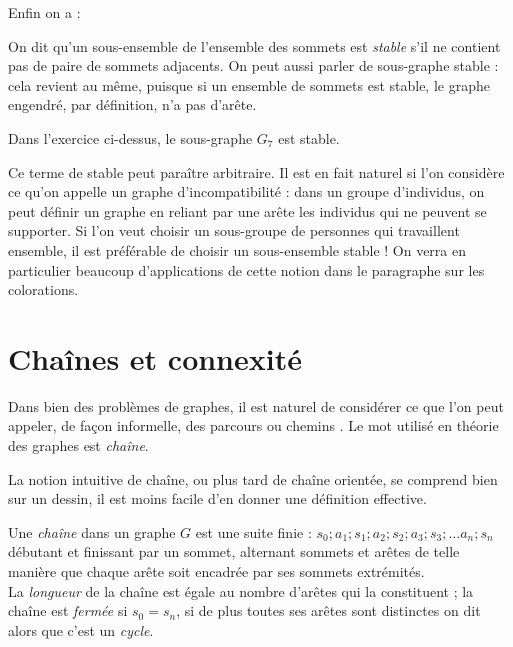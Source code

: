 \documentclass[french]{book}
\begin{document}
Enfin on a :

\begin{defn} On dit qu'un sous-ensemble de l'ensemble des sommets est \emph{stable} s'il ne contient pas de paire de sommets adjacents.
On peut aussi parler de sous-graphe stable : cela revient au même, puisque si un ensemble de
sommets est stable, le graphe engendré, par définition, n'a pas d'arête. \end{defn}

\begin{exemple} Dans l'exercice ci-dessus, le sous-graphe $G_7$ est stable. \end{exemple}

Ce terme de \og stable \fg{} peut paraître arbitraire. Il est en fait naturel si l'on considère ce qu'on appelle un \og graphe d'incompatibilité \fg{} : dans un groupe d'individus, on peut définir un graphe en reliant par une arête les individus qui ne peuvent se supporter. Si l'on veut choisir un sous-groupe de personnes qui travaillent ensemble, il est préférable de choisir un sous-ensemble stable ! On verra en particulier beaucoup d'applications de cette notion dans le paragraphe sur les colorations.

\section{Chaînes et connexité}

Dans bien des problèmes de graphes, il est naturel de considérer ce que l'on peut appeler, de façon informelle, des \og parcours \fg{} ou \og chemins \fg. Le mot utilisé en théorie des graphes est \emph{chaîne}.

La notion intuitive de chaîne, ou plus tard de chaîne orientée, se comprend bien sur un dessin, il est moins facile d'en donner une définition effective.

\begin{defn}
Une \emph{chaîne} dans un graphe $G$ est une suite finie : $s_0; a_1; s_1; a_2; s_2; a_3; s_3; \dots a_n; s_n$ débutant et finissant par un sommet, alternant sommets et arêtes de telle manière que chaque arête soit encadrée par ses sommets extrémités. \\
La \emph{longueur} de la chaîne est égale au nombre d'arêtes qui la constituent ; la chaîne est \emph{fermée} si $s_0 = s_n$, si de plus toutes ses arêtes sont distinctes on dit alors que c'est un \emph{cycle}.
\end{defn}
\end{document}
